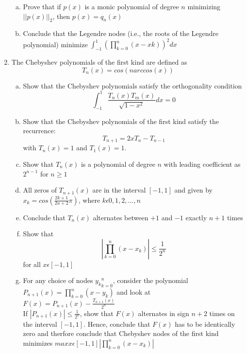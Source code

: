 \documentclass{article}
\begin{document}
\begin{enumerate}
\begin{enumerate}[(a)]
\item Prove that if $p(x)$ is a monic polynomial of degree $n$ minimizing $||p(x)||_{2}$, then $p(x) = q_{n}(x)$
\item Conclude that the Legendre nodes (i.e., the roots of the Legendre polynomial) minimize $\displaystyle \int_{-1}^{1} \left( \prod_{k=0}^{n} (x-x{k}) \right)^{2} dx$
\end{enumerate}

\item The Chebyshev polynomials of the first kind are defined as
    $$T_{n}(x) = cos(n arccos(x))$$

\begin{enumerate}[(a)]
\item Show that the Chebyshev polynomials satisfy the orthogonality condition
    $$\displaystyle \int_{-1}^{1} \frac{T_{n}(x) T_{m}(x)}{\sqrt{1 - x^{2}}} dx = 0$$

\item Show that the Chebyshev polynomials of the first kind satisfy the recurrence:
    $$T_{n+1} = 2xT_{n} - T_{n-1}$$
with $T_{n}(x) = 1$ and $T_{1}(x) = 1$.

\item Show that $T_{n}(x)$ is a polynomial of degree $n$ with leading coefficient as $2^{n-1}$ for $n \geq 1$

\item All zeros of $T_{n+1}(x)$ are in the interval $[-1, 1]$ and given by $x_{k} = cos \left( \displaystyle \frac{2k+1}{2n+2} \pi \right)$, where $k \epsilon {0, 1, 2, ..., n}$

\item Conclude that $T_{n}(x)$ alternates between $+1$ and $-1$ exactly $n+1$ times
\item Show that
    $$\displaystyle \left| \prod_{k=0}^{n} (x - x_{k}) \right| \leq \frac{1}{2^{n}}$$
for all $x \epsilon [-1, 1]$


\item For any choice of nodes ${y_{k}}_{k=0}^{n}$, consider the polynomial $P_{n+1}(x) = \displaystyle \prod_{k=0}^{n} (x - y_{k})$ and look at $F(x) = P_{n+1}(x) - \frac{T_{n+1}(x)}{2^{n}}$ \\

If $\displaystyle |P_{n+1}(x)| \leq  \frac{1}{2^{n}}$, show that $F(x)$ alternates in sign $n+2$ times on the interval $[-1, 1]$. Hence, conclude that $F(x)$ has to be identically zero and therfore conclude that Chebyshev nodes of the first kind minimizes $max x \epsilon [-1, 1] \left| \displaystyle \prod_{k=0}^{n} (x - x_{k}) \right|$
\end{enumerate}


\end{enumerate}
\end{document}
